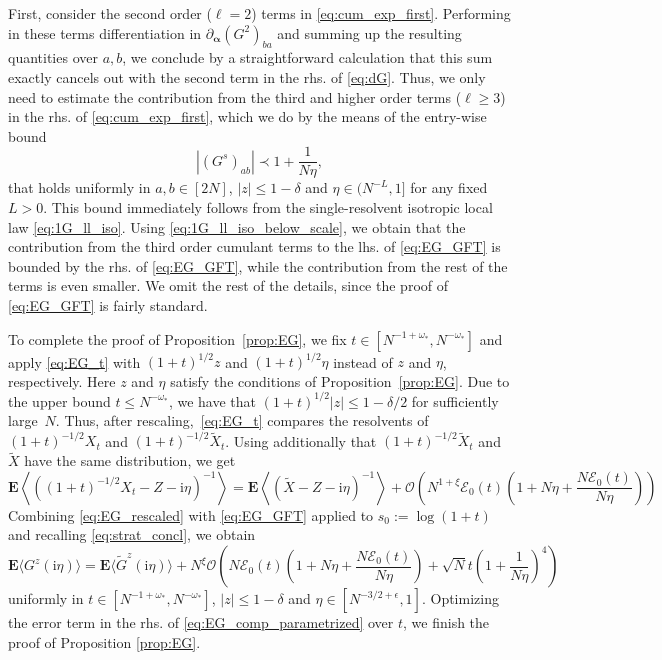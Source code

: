 \documentclass[10pt]{amsart}
\numberwithin{equation}{section}
\newcommand{\E}{\mathbf{E}}
\newcommand{\ii}{\mathrm{i}}
\begin{document}
First, consider the second order ($\ell=2$) terms in \eqref{eq:cum_exp_first}. Performing in these terms differentiation in $\partial_{\bm{\alpha}}(G^2)_{ba}$ and summing up the resulting quantities over $a,b$, we conclude by a straightforward calculation that this sum exactly cancels out with the second term in the rhs. of \eqref{eq:dG}. Thus, we only need to estimate the contribution from the third and higher order terms ($\ell\ge 3$) in the rhs. of \eqref{eq:cum_exp_first}, which we do by the means of the entry-wise bound 
\begin{equation}
\left\vert(G^{s})_{ab}\right\vert\prec 1+\frac{1}{N\eta},
\label{eq:1G_ll_iso_below_scale}
\end{equation}
that holds uniformly in $a,b\in [2N]$, $|z|\le 1-\delta$ and $\eta\in (N^{-L},1]$ for any fixed $L>0$. This bound immediately follows from the single-resolvent isotropic local law \eqref{eq:1G_ll_iso}. Using \eqref{eq:1G_ll_iso_below_scale}, we obtain that the contribution from the third order cumulant terms to the lhs. of \eqref{eq:EG_GFT} is bounded by the rhs. of \eqref{eq:EG_GFT}, while the contribution from the rest of the terms is even smaller. We omit the rest of the details, since the proof of \eqref{eq:EG_GFT} is fairly standard.


To complete the proof of Proposition~\ref{prop:EG}, we fix $t\in [N^{-1+\omega_*}, N^{-\omega_*}]$ and apply \eqref{eq:EG_t} with $(1+t)^{1/2}z$ and $(1+t)^{1/2}\eta$ instead of $z$ and $\eta$, respectively. Here $z$ and $\eta$ satisfy the conditions of Proposition~\ref{prop:EG}. Due to the upper bound $t\le N^{-\omega_*}$, we have that $(1+t)^{1/2}|z|\le 1-\delta/2$ for sufficiently large~$N$. Thus, after rescaling,~\eqref{eq:EG_t} compares the resolvents of $(1+t)^{-1/2} X_t$  and $(1+t)^{-1/2} \widetilde{X}_t$. Using additionally that $(1+t)^{-1/2}\widetilde{X}_t$ and~$\widetilde{X}$ have the same distribution, we get
\begin{equation}
\E \left\langle\left((1+t)^{-1/2}X_t - Z -\ii\eta\right)^{-1}\right\rangle = \E \left\langle\left(\widetilde{X} - Z -\ii\eta\right)^{-1}\right\rangle + \mathcal{O}\left(N^{1+\xi}\mathcal{E}_0(t)\left(1+N\eta + \frac{N\mathcal{E}_0(t)}{N\eta} \right)\right)
\label{eq:EG_rescaled}
\end{equation}
Combining \eqref{eq:EG_rescaled} with \eqref{eq:EG_GFT} applied to $s_0:=\log(1+t)$ and recalling \eqref{eq:strat_concl}, we obtain
\begin{equation}
\E\langle G^z(\ii\eta)\rangle = \E \langle \widetilde{G}^z(\ii\eta)\rangle + N^\xi\mathcal{O}\left(N\mathcal{E}_0(t)\left(1+N\eta + \frac{N\mathcal{E}_0(t)}{N\eta}\right) +\sqrt{N}t\left(1+\frac{1}{N\eta}\right)^4  \right)
\label{eq:EG_comp_parametrized}
\end{equation}
uniformly in $t\in [N^{-1+\omega_*}, N^{-\omega_*}]$, $|z|\le 1-\delta$ and $\eta\in [N^{-3/2+\epsilon},1]$. Optimizing the error term in the rhs. of \eqref{eq:EG_comp_parametrized} over $t$, we finish the proof of Proposition \ref{prop:EG}.
\end{document}
